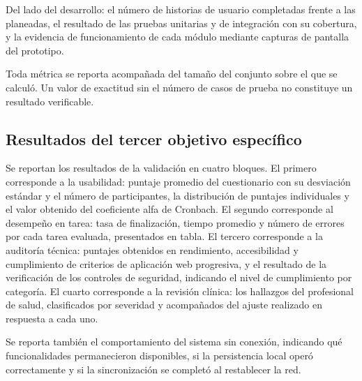 \documentclass[conference]{IEEEtran}
\begin{document}
Del lado del desarrollo: el número de historias de usuario completadas frente a las planeadas, el resultado de las pruebas unitarias y de integración con su cobertura, y la evidencia de funcionamiento de cada módulo mediante capturas de pantalla del prototipo.

Toda métrica se reporta acompañada del tamaño del conjunto sobre el que se calculó. Un valor de exactitud sin el número de casos de prueba no constituye un resultado verificable.

\subsection{Resultados del tercer objetivo específico}
Se reportan los resultados de la validación en cuatro bloques. El primero corresponde a la usabilidad: puntaje promedio del cuestionario con su desviación estándar y el número de participantes, la distribución de puntajes individuales y el valor obtenido del coeficiente alfa de Cronbach. El segundo corresponde al desempeño en tarea: tasa de finalización, tiempo promedio y número de errores por cada tarea evaluada, presentados en tabla. El tercero corresponde a la auditoría técnica: puntajes obtenidos en rendimiento, accesibilidad y cumplimiento de criterios de aplicación web progresiva, y el resultado de la verificación de los controles de seguridad, indicando el nivel de cumplimiento por categoría. El cuarto corresponde a la revisión clínica: los hallazgos del profesional de salud, clasificados por severidad y acompañados del ajuste realizado en respuesta a cada uno.

Se reporta también el comportamiento del sistema sin conexión, indicando qué funcionalidades permanecieron disponibles, si la persistencia local operó correctamente y si la sincronización se completó al restablecer la red.
\end{document}

